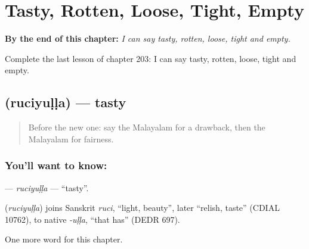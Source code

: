 
\chapter{Tasty, Rotten, Loose, Tight, Empty}
\label{ch:ml-tasty-rotten-loose-tight-empty}

\begin{chapteropening}
\textbf{By the end of this chapter:} \emph{I can say tasty, rotten, loose, tight and empty.}

Complete the last lesson of chapter 203: I can say tasty, rotten, loose, tight and empty.
\end{chapteropening}

\section[\texorpdfstring{\ml{രുചിയുള്ള} (ruciyuḷḷa)}{രുചിയുള്ള (ruciyuḷḷa)}]{ (ruciyuḷḷa) — tasty}

\label{lesson:ML-C203-ruciyulla}



\begin{quote}
Before the new one: say the Malayalam for a drawback, then the Malayalam for fairness.
\end{quote}

\subsection*{You'll want to know: }
\textbf{} — \emph{ruciyuḷḷa} — \textquotedblleft{}tasty\textquotedblright{}.

\begin{cousinweb}
\textbf{} (\emph{ruciyuḷḷa}) joins Sanskrit \emph{ruci}, \textquotedblleft{}light, beauty\textquotedblright{}, later \textquotedblleft{}relish, taste\textquotedblright{} (CDIAL 10762), to native \emph{-uḷḷa}, \textquotedblleft{}that has\textquotedblright{} (DEDR 697).
\end{cousinweb}

\begin{grammarlens}[title={What you've built}]
One more word for this chapter.
\end{grammarlens}

